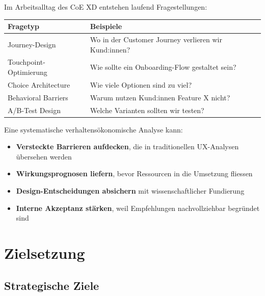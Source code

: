 \documentclass[11pt,a4paper]{article}
\newcommand{\fahead}[1]{\textcolor{fawhite}{\bfseries #1}}
\begin{document}
Im Arbeitsalltag des CoE XD entstehen laufend Fragestellungen:

\begin{center}
\begin{tabular}{p{4cm}p{9cm}}
\toprule
\rowcolor{fadarkblue}
\fahead{Fragetyp} & \fahead{Beispiele} \\
\midrule
\rowcolor{fawhite}
Journey-Design & Wo in der Customer Journey verlieren wir Kund:innen? \\
\rowcolor{falightgray}
Touchpoint-Optimierung & Wie sollte ein Onboarding-Flow gestaltet sein? \\
\rowcolor{fawhite}
Choice Architecture & Wie viele Optionen sind zu viel? \\
\rowcolor{falightgray}
Behavioral Barriers & Warum nutzen Kund:innen Feature X nicht? \\
\rowcolor{fawhite}
A/B-Test Design & Welche Varianten sollten wir testen? \\
\bottomrule
\end{tabular}
\end{center}

\vspace{0.5cm}

Eine systematische verhaltensökonomische Analyse kann:

\begin{itemize}
    \item \textbf{Versteckte Barrieren aufdecken}, die in traditionellen UX-Analysen übersehen werden
    \item \textbf{Wirkungsprognosen liefern}, bevor Ressourcen in die Umsetzung fliessen
    \item \textbf{Design-Entscheidungen absichern} mit wissenschaftlicher Fundierung
    \item \textbf{Interne Akzeptanz stärken}, weil Empfehlungen nachvollziehbar begründet sind
\end{itemize}

\newpage
\section{Zielsetzung}

\subsection{Strategische Ziele}
\end{document}

